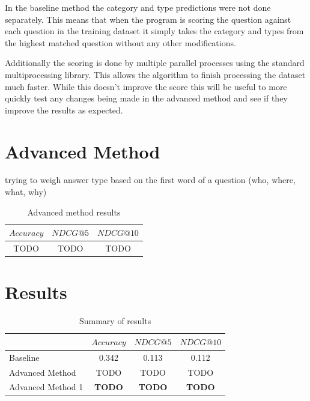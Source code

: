 \documentclass[sigconf]{acmart}
\begin{document}
In the baseline method the category and type predictions were not done separately. This means that when the program is scoring the question against each question in the training dataset it simply takes the category and types from the highest matched question without any other modifications.

Additionally the scoring is done by multiple parallel processes using the standard multiprocessing library. This allows the algorithm to finish processing the dataset much faster. While this doesn't improve the score this will be useful to more quickly test any changes being made in the advanced method and see if they improve the results as expected.



\section{Advanced Method}

trying to weigh answer type based on the first word of a question (who, where, what, why) 

\begin{table}[h]
    \centering
    \caption{Advanced method results}
    \begin{tabular}{c|c|c}
    $Accuracy$ & $NDCG@5$ & $NDCG@10$ \\
    \hline
    TODO & TODO & TODO
    \end{tabular}
    \label{tab:baseline_res}
\end{table}


\section{Results}


\begin{table}[h]
\begin{center}
\caption{Summary of results}
\begin{tabular}{l|c|c|c}
     & $Accuracy$ & $NDCG@5$ & $NDCG@10$ \\
    \hline
    Baseline & 0.342 &  0.113 & 0.112 \\
    Advanced Method & TODO & TODO &  TODO \\
    Advanced Method 1 & \textbf{TODO} & \textbf{TODO} & \textbf{TODO} 
\end{tabular}
\label{table:1}
\end{center}
\end{table}
\end{document}
